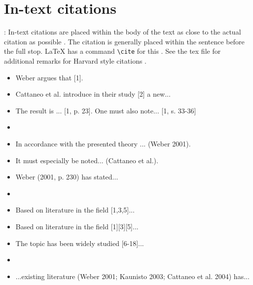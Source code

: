 \documentclass[12pt,a4paper,finnish]{tutthesis}
\begin{document}
\section{In-text citations}
:
In-text citations are placed within the body of the text as close to
the actual citation as possible \parencite{rubberwheel}. The citation is generally placed
within the sentence before the full stop. LaTeX has a command
\texttt{\textbackslash cite} for this \parencite[p. 85]{oetiker14}. See the
tex file for additional remarks for Harvard style citations \parencites {wang2010143}{alrefaie2010842}
\parencite{alrefaie2010842}.
%
%



\begin{itemize}
  \setlength{\itemsep}{-10pt} %
  \small
\item[] Weber argues that [1]. 
\item[] Cattaneo et al. introduce in their study [2] a new...
\item[] The result is ... [1, p. 23]. One must also note... [1, s. 33-36]
\item[]
\item[] In accordance with the presented theory ... (Weber 2001).
\item[] It must especially be noted... (Cattaneo et al.).
\item[] Weber (2001, p. 230) has stated...
\item[]
\item[] Based on literature in the field [1,3,5]...
\item[] Based on literature in the field [1][3][5]...
\item[] The topic has been widely studied [6-18]...
\item[]
\item[] ...existing literature (Weber 2001; Kaunisto 2003; Cattaneo et al. 2004) has...
\end{itemize}
\end{document}
